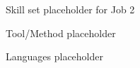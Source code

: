 \begin{onecolentry}
  \begin{highlights}
    \item Skill set placeholder for Job 2
    \item Tool/Method placeholder
    \item Languages placeholder
  \end{highlights}
\end{onecolentry}
